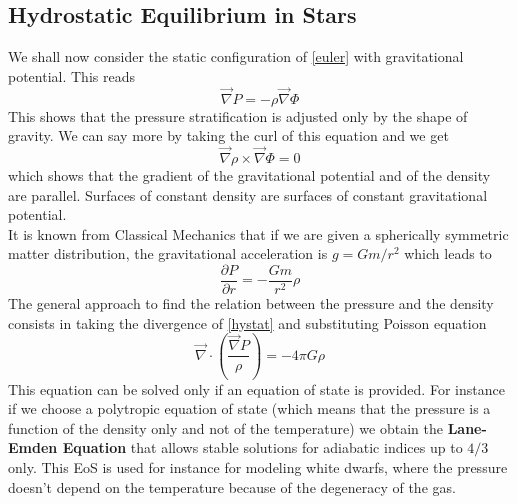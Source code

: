 \subsection{Hydrostatic Equilibrium in Stars}
We shall now consider the static configuration of \ref{euler} with gravitational potential. This reads
\begin{equation} \label{hystat}
	\vec \nabla P = - \rho \vec \nabla \Phi
\end{equation}
This shows that the pressure stratification is adjusted only by the shape of gravity. We can say more by taking the curl of this equation and we get
$$
\vec \nabla \rho \times  \vec \nabla \Phi =0
$$
which shows that the gradient of the gravitational potential and of the density are parallel. Surfaces of constant density are surfaces of constant gravitational potential.\\
It is known from Classical Mechanics that if we are given a spherically symmetric matter distribution, the gravitational acceleration is $g=Gm/r^2$ which leads to
\begin{equation}\label{HydroEquilibrium}
	\frac{\partial P}{\partial r}= - \frac{G m}{r^2} \rho
\end{equation}
The general approach to find the relation between the pressure and the density consists in taking the divergence of \ref{hystat} and substituting Poisson equation 
$$
\vec \nabla \cdot \left ( \frac{\vec \nabla P}{\rho} \right ) = - 4 \pi G \rho 
$$
This equation can be solved only if an equation of state is provided. For instance if we choose a polytropic equation of state (which means that the pressure is a function of the density only and not of the temperature) we obtain the \textbf{Lane-Emden Equation} that allows stable solutions for adiabatic indices up to $4/3$ only. This EoS is used for instance for modeling white dwarfs, where the pressure doesn't depend on the temperature because of the degeneracy of the gas. \\ 

